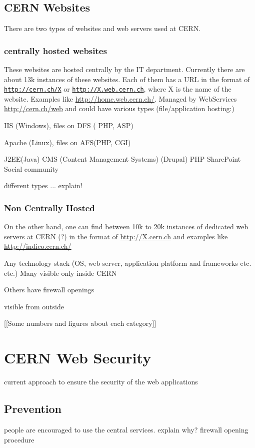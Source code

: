 \subsection{CERN Websites}
There are two types of websites and web servers used at CERN.
\subsubsection{centrally hosted websites}
These websites are hosted centrally by the IT department. Currently there are about 13k instances of these websites. Each of them has a URL in the format of \texttt{\url{http://cern.ch/X}} or \texttt{\url{http://X.web.cern.ch}}, where X is the name of the website. Examples like \url{http://home.web.cern.ch/}. Managed by WebServices \url{http://cern.ch/web} and could have various types 
(file/application hosting:)

IIS (Windows), files on DFS ( PHP, ASP)

Apache (Linux), files on AFS(PHP, CGI)

J2EE(Java) 
CMS (Content Management Systems) (Drupal) PHP
SharePoint
Social community











different types ... explain!
\subsubsection{Non Centrally Hosted}

On the other hand, one can find between 10k to 20k instances of dedicated web servers at CERN (?) in the format of \url{http://X.cern.ch} and examples like \url{http://indico.cern.ch/}

Any technology stack (OS, web server, application platform
and frameworks etc. etc.)
Many visible only inside CERN

Others have firewall openings

visible from outside

[[Some numbers and figures about each category]]


\section{CERN Web Security}
current approach to ensure the security of the web applications
\subsection{Prevention}
people are encouraged to use the central services. explain why?
firewall opening procedure

